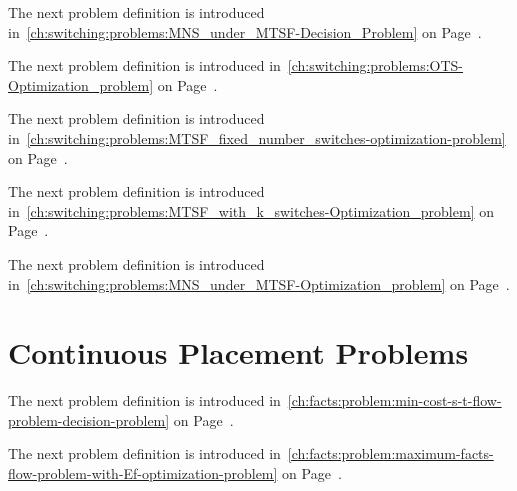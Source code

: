 \gapsizeProblems
The next problem definition is introduced 
in~\cref{ch:switching:problems:MNS_under_MTSF-Decision_Problem} on
Page~\pageref{ch:switching:problems:MNS_under_MTSF-Decision_Problem}.
% 


\gapsizeProblems
The next problem definition is introduced 
in~\cref{ch:switching:problems:OTS-Optimization_problem} on
Page~\pageref{ch:switching:problems:OTS-Optimization_problem}.
% 


\gapsizeProblems
The next problem definition is introduced 
in~\cref{ch:switching:problems:MTSF_fixed_number_switches-optimization-problem}
on
Page~\pageref{ch:switching:problems:MTSF_fixed_number_switches-optimization-problem}.
% 


\gapsizeProblems
The next problem definition is introduced 
in~\cref{ch:switching:problems:MTSF_with_k_switches-Optimization_problem} on
Page~\pageref{ch:switching:problems:MTSF_with_k_switches-Optimization_problem}.
% 


\gapsizeProblems
The next problem definition is introduced 
in~\cref{ch:switching:problems:MNS_under_MTSF-Optimization_problem} on
Page~\pageref{ch:switching:problems:MNS_under_MTSF-Optimization_problem}.
% 

% 
\section{Continuous Placement Problems}
\label{app:problems:continuous-placement-problems}
The next problem definition is introduced 
in~\cref{ch:facts:problem:min-cost-s-t-flow-problem-decision-problem} on
Page~\pageref{ch:facts:problem:min-cost-s-t-flow-problem-decision-problem}.
% 


\gapsizeProblems
The next problem definition is introduced 
in~\cref{ch:facts:problem:maximum-facts-flow-problem-with-Ef-optimization-problem}
on
Page~\pageref{ch:facts:problem:maximum-facts-flow-problem-with-Ef-optimization-problem}.
% 


